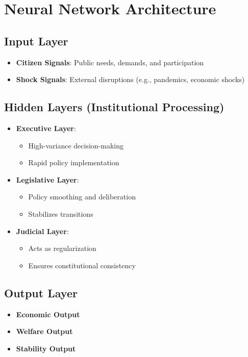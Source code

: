 \documentclass[12pt]{article}
\begin{document}
\section{Neural Network Architecture}

\subsection{Input Layer}

\begin{itemize}
\item \textbf{Citizen Signals}: Public needs, demands, and participation
\item \textbf{Shock Signals}: External disruptions (e.g., pandemics, economic shocks)
\end{itemize}

\subsection{Hidden Layers (Institutional Processing)}

\begin{itemize}
\item \textbf{Executive Layer}:
\begin{itemize}
\item High-variance decision-making
\item Rapid policy implementation
\end{itemize}

\item \textbf{Legislative Layer}:
\begin{itemize}
\item Policy smoothing and deliberation
\item Stabilizes transitions
\end{itemize}

\item \textbf{Judicial Layer}:
\begin{itemize}
\item Acts as regularization
\item Ensures constitutional consistency
\end{itemize}
\end{itemize}

\subsection{Output Layer}

\begin{itemize}
\item \textbf{Economic Output}
\item \textbf{Welfare Output}
\item \textbf{Stability Output}
\end{itemize}
\end{document}
